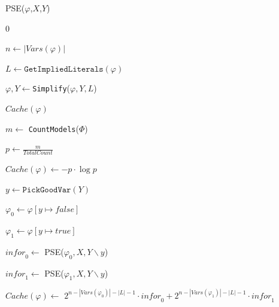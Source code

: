 \begin{algorithm}[h]
	\caption{PSE($\varphi$,$X$,$Y$)}
	\label{PSE}
	\LinesNumbered
    \DontPrintSemicolon
	 {\Return $0$}
	
	$n \leftarrow |\mathit{Vars}(\varphi)|$
	
	$L \leftarrow \texttt{GetImpliedLiterals}(\varphi)$ 
	
	$\varphi,Y \leftarrow $\texttt{Simplify}($\varphi, Y, L$) 
	
	 {\Return $\mathit{Cache}(\varphi)$}
	{
		$m \leftarrow $ \texttt{CountModels}($\Phi$) 
		
		$p \leftarrow \frac{m}{TotalCount} $
		
		
		\Return  $Cache(\varphi)  \leftarrow 
		-p \cdot \log {p}$
	}
	$ y \leftarrow \texttt{PickGoodVar}(Y)$
	
	$ \varphi_0 \leftarrow \varphi[y \mapsto \mathit{false}]$
	
	$ \varphi_1 \leftarrow  \varphi[y \mapsto \mathit{true}]$
	
	$\mathit{infor}_0 \leftarrow $ PSE($\varphi_0,X,Y \backslash y$)
	
	$\mathit{infor}_1 \leftarrow $  PSE($\varphi_1,X,Y \backslash y$) 
	
	\Return $\mathit{Cache}(\varphi)  \leftarrow $ $2^{n - |\mathit{Vars}(\varphi_0)| - |L| - 1} \cdot  \mathit{infor}_0 +  2^{n - |\mathit{Vars}(\varphi_1)| - |L| - 1} \cdot \mathit{infor}_1$
	
\end{algorithm}

